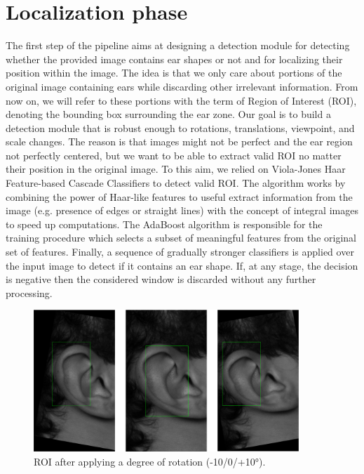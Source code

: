 \documentclass{article}
\begin{document}
\section{Localization phase}

The first step of the pipeline aims at designing a detection module for detecting whether the provided image
contains ear shapes or not and for localizing their position within the image. The idea is that we only care
about portions of the original image containing ears while discarding other irrelevant information.
From now on, we will refer to these portions with the term of Region of Interest (ROI), denoting the bounding
box surrounding the ear zone. Our goal is to build a detection module that is robust enough to rotations,
translations, viewpoint, and scale changes. The reason is that images might not be perfect and the ear region
not perfectly centered, but we want to be able to extract valid ROI no matter their position in the original
image. To this aim, we relied on Viola-Jones Haar Feature-based Cascade Classifiers \cite{conf/cvpr/ViolaJ01}
to detect valid ROI.
The algorithm works by combining the power of Haar-like features to useful extract information from the
image (e.g. presence of edges or straight lines) with the concept of integral images to speed up computations.
The AdaBoost algorithm is responsible for the training procedure which selects a subset of meaningful features
from the original set of features. Finally, a sequence of gradually stronger classifiers is applied over the
input image to detect if it contains an ear shape. If, at any stage, the decision is negative then the considered
window is discarded without any further processing.

\begin{figure}[h]
    \label{fig:detection}
    \begin{center}
        \includegraphics[width=10cm,keepaspectratio]{images/detection.png}
        \caption{ROI after applying a degree of rotation (-10/0/+10°).}
    \end{center}
\end{figure}
\end{document}
